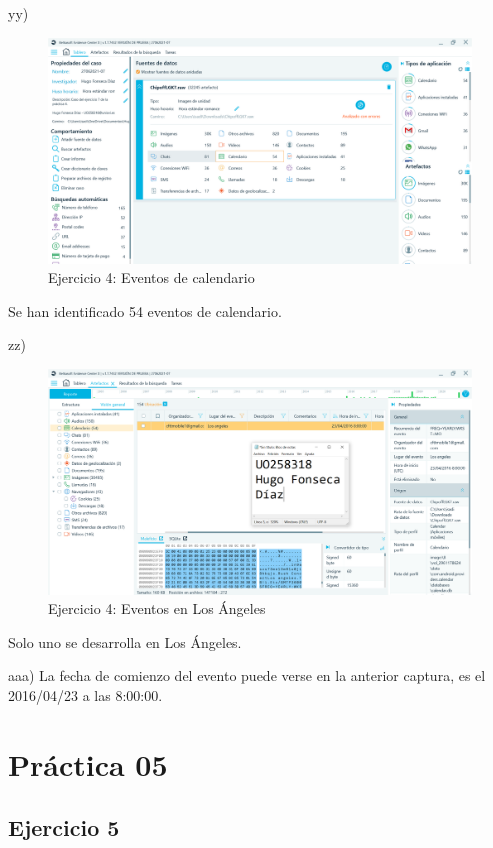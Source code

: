 \documentclass[11pt]{article}
\begin{document}
yy)

\begin{figure}[H]
    \caption{Ejercicio 4: Eventos de calendario}
    \centering
    \includegraphics[scale=0.4]{p04/e7-16.PNG}
\end{figure}

Se han identificado 54 eventos de calendario.

zz)

\begin{figure}[H]
    \caption{Ejercicio 4: Eventos en Los Ángeles}
    \centering
    \includegraphics[scale=0.4]{p04/e7-17.PNG}
\end{figure}

Solo uno se desarrolla en Los Ángeles.

aaa) La fecha de comienzo del evento puede verse en la anterior captura, es el 2016/04/23 a las 8:00:00.



\section{Práctica 05}

\subsection{Ejercicio 5}
\end{document}
